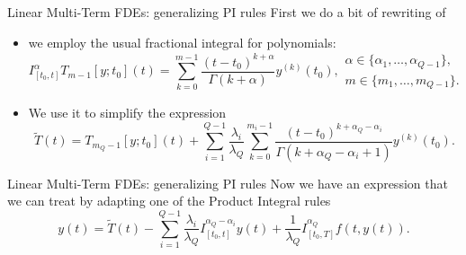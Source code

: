 \documentclass[aspectratio=169,xcolor=dvipsnames]{beamer}
\begin{document}
\begin{frame}{Linear Multi-Term FDEs: generalizing PI rules}
First we do a bit of rewriting of
\begin{itemize}
	\item<1-> we employ the usual fractional integral for polynomials: \[I_{[t_0,t]}^{\alpha} T_{m-1}[y;t_0](t) = \sum_{k=0}^{m-1} \frac{(t-t_0)^{k+\alpha}}{\Gamma(k+\alpha)} y^{(k)}(t_0), \begin{array}{l} \alpha \in \{\alpha_1,\ldots,\alpha_{Q-1}\}, \\ m \in \{m_1,\ldots,m_{Q-1}\}.\end{array}\]
	\item<2-> We use it to \alert<2>{simplify the expression}
	\[
	\tilde{T}(t) = T_{m_Q-1}[y;t_0](t) + \sum_{i=1}^{Q-1} \frac{\lambda_i}{\lambda_Q} \sum_{k=0}^{m_i-1} \frac{(t-t_0)^{k+\alpha_Q-\alpha_i}}{\Gamma(k+\alpha_Q-\alpha_i+1)}y^{(k)}(t_0).
	\]
\end{itemize}
\end{frame}

\begin{frame}{Linear Multi-Term FDEs: generalizing PI rules}
Now we have an expression that we can treat by adapting one of the Product Integral rules
\[
y(t) = \tilde{T}(t) - \sum_{i=1}^{Q-1} \frac{\lambda_i}{\lambda_Q} I_{[t_0,t]}^{\alpha_{Q}  - \alpha_i} y(t) + \frac{1}{\lambda_Q} I_{[t_0,T]}^{\alpha_Q} f(t,y(t)).
\]
\end{frame}
\end{document}
